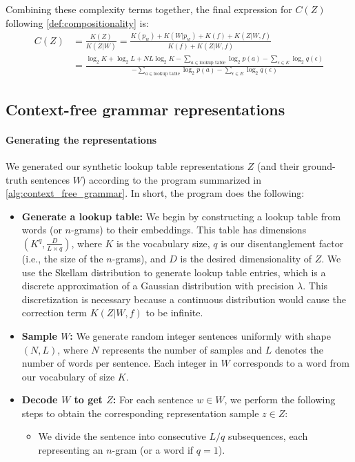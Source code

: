 \documentclass{article}
\begin{document}
\begin{appendices}
Combining these complexity terms together, the final expression for $C(Z)$ following \cref{def:compositionality} is:
\begin{align*}
    C(Z) &= \frac{K(Z)}{K(Z|W)} = \frac{K(p_w) + K(W|p_w) + K(f) + K(Z|W,f)}{K(f) + K(Z|W,f)} \\
    &=
    \frac{\log_2 K + \log_2 L + NL\log_2 K - \sum_{a \in \text{lookup table}} \log_2 p(a) - \sum_{\epsilon \in E} \log_2 q(\epsilon)}{-\sum_{a \in \text{lookup table}} \log_2 p(a) - \sum_{\epsilon \in E} \log_2 q(\epsilon)}
\end{align*}

\subsection{Context-free grammar representations}

\paragraph{Generating the representations}

We generated our synthetic lookup table representations $Z$ (and their ground-truth sentences $W$) according to the program summarized in \cref{alg:context_free_grammar}. In short, the program does the following:

\begin{itemize}
    \item \textbf{Generate a lookup table:}
    We begin by constructing a lookup table from words (or $n$-grams) to their embeddings. This table has dimensions $(K^q, \frac{D}{L \times q})$, where $K$ is the vocabulary size, $q$ is our disentanglement factor (i.e., the size of the $n$-grams), and $D$ is the desired dimensionality of $Z$. We use the Skellam distribution to generate lookup table entries, which is a discrete approximation of a Gaussian distribution with precision $\lambda$. This discretization is necessary because a continuous distribution would cause the correction term $K(Z|W,f)$ to be infinite.
    
    \item \textbf{Sample $W$:}
    We generate random integer sentences uniformly with shape $(N, L)$, where $N$ represents the number of samples and $L$ denotes the number of words per sentence. Each integer in $W$ corresponds to a word from our vocabulary of size $K$.
    
    \item \textbf{Decode $W$ to get $Z$:}
    For each sentence $w \in W$, we perform the following steps to obtain the corresponding representation sample $z \in Z$:
    \begin{itemize}
        \item We divide the sentence into consecutive $L/q$ subsequences, each representing an $n$-gram (or a word if $q=1$).
        

\end{itemize}
\end{itemize}
\end{appendices}
\end{document}
